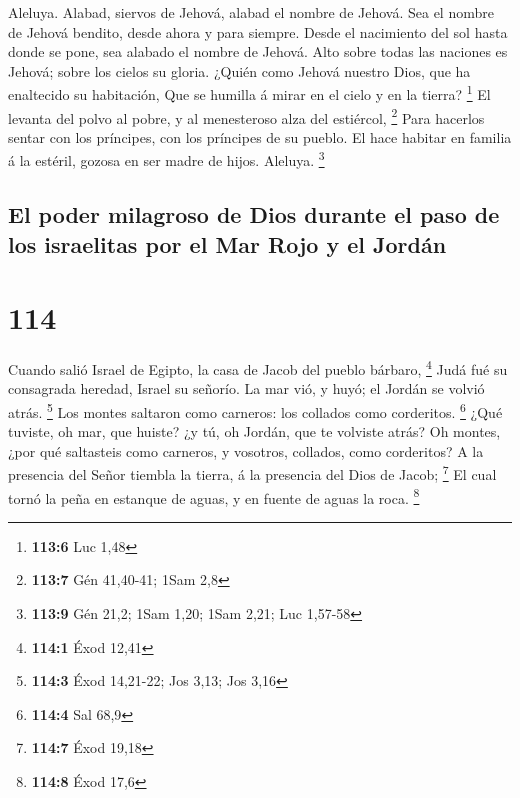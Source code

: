  Aleluya. Alabad, siervos de Jehová, alabad el nombre de
Jehová.  Sea el nombre de Jehová bendito, desde ahora y para
siempre.  Desde el nacimiento del sol hasta donde se pone,
sea alabado el nombre de Jehová.  Alto sobre todas las
naciones es Jehová; sobre los cielos su gloria.  ¿Quién como
Jehová nuestro Dios, que ha enaltecido su habitación,  Que
se humilla á mirar en el cielo y en la tierra? \footnote{\textbf{113:6}
  Luc 1,48}  El levanta del polvo al pobre, y al menesteroso
alza del estiércol, \footnote{\textbf{113:7} Gén 41,40-41; 1Sam 2,8}
 Para hacerlos sentar con los príncipes, con los príncipes
de su pueblo.  El hace habitar en familia á la estéril,
gozosa en ser madre de hijos. Aleluya. \footnote{\textbf{113:9} Gén
  21,2; 1Sam 1,20; 1Sam 2,21; Luc 1,57-58}

\hypertarget{el-poder-milagroso-de-dios-durante-el-paso-de-los-israelitas-por-el-mar-rojo-y-el-jorduxe1n}{%
\subsection{El poder milagroso de Dios durante el paso de los israelitas
por el Mar Rojo y el
Jordán}\label{el-poder-milagroso-de-dios-durante-el-paso-de-los-israelitas-por-el-mar-rojo-y-el-jorduxe1n}}

\hypertarget{section-113}{%
\section{114}\label{section-113}}

 Cuando salió Israel de Egipto, la casa de Jacob del pueblo
bárbaro, \footnote{\textbf{114:1} Éxod 12,41}  Judá fué su
consagrada heredad, Israel su señorío.  La mar vió, y huyó;
el Jordán se volvió atrás. \footnote{\textbf{114:3} Éxod 14,21-22; Jos
  3,13; Jos 3,16}  Los montes saltaron como carneros: los
collados como corderitos. \footnote{\textbf{114:4} Sal 68,9}
 ¿Qué tuviste, oh mar, que huiste? ¿y tú, oh Jordán, que te
volviste atrás?  Oh montes, ¿por qué saltasteis como
carneros, y vosotros, collados, como corderitos?  A la
presencia del Señor tiembla la tierra, á la presencia del Dios de Jacob;
\footnote{\textbf{114:7} Éxod 19,18}  El cual tornó la peña
en estanque de aguas, y en fuente de aguas la roca. \footnote{\textbf{114:8}
  Éxod 17,6}

